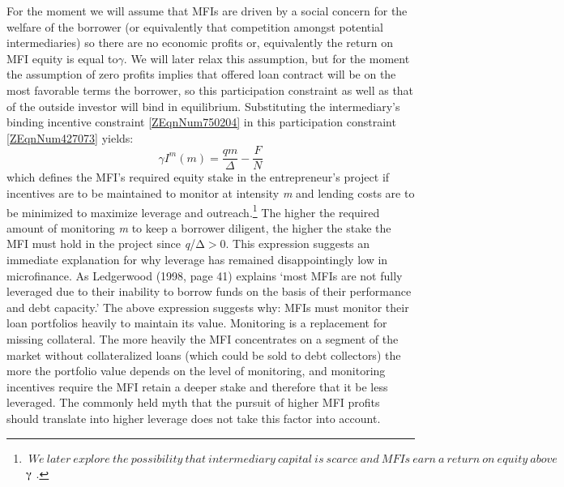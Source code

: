 \documentclass{article} %
\begin{document}
For the moment we will assume that MFIs are driven by a social concern for the welfare of the borrower (or equivalently that competition amongst potential intermediaries) so there are no economic profits or, equivalently the return on MFI equity is equal to$\gamma $.  We will later relax this assumption, but for the moment the assumption of zero profits implies that offered loan contract will be on the most favorable terms the borrower, so this participation constraint as well as that of the outside investor will bind in equilibrium.  Substituting the intermediary's binding incentive constraint \eqref{ZEqnNum750204} in  this participation constraint \eqref{ZEqnNum427073} yields:
\begin{equation} \label{ZEqnNum840214} 
\gamma I^{m} (m)=\frac{qm}{\Delta } -\frac{F}{N}  
\end{equation} 
which defines the MFI's required equity stake in the entrepreneur's project if incentives are to be maintained to monitor at intensity \textit{m} and lending costs are to be minimized to maximize leverage and outreach.\footnote{ $\ We\ later\ explore\ the\ possibility\ that\ intermediary\ capital\ is\ scarce\ and\ MFIs\ earn\ a\ return\ on\ equity\ above\ $  $\mathrm{\gammaup }$  $.$ }  The higher the required amount of monitoring \textit{m }to keep a borrower diligent, the higher the stake the MFI must hold in the project since \textit{q}/$\mathrm{\Delta }$$\mathrm{>}$0.  This expression suggests an immediate explanation for why leverage has remained disappointingly low in microfinance.  As Ledgerwood (1998, page 41) explains `most MFIs are not fully leveraged due to their inability to borrow funds on the basis of their performance and debt capacity.'  The above expression suggests why:  MFIs must monitor their loan portfolios heavily to maintain its value.  Monitoring is a replacement for missing collateral. The more heavily the MFI concentrates on a segment of the market without collateralized loans (which could be sold to debt collectors) the more the portfolio value depends on the level of monitoring, and monitoring incentives require the MFI retain a deeper stake and therefore that it be less leveraged.  The commonly held myth that the pursuit of higher MFI profits should translate into higher leverage does not take this factor into account. \textit{}
\end{document}
